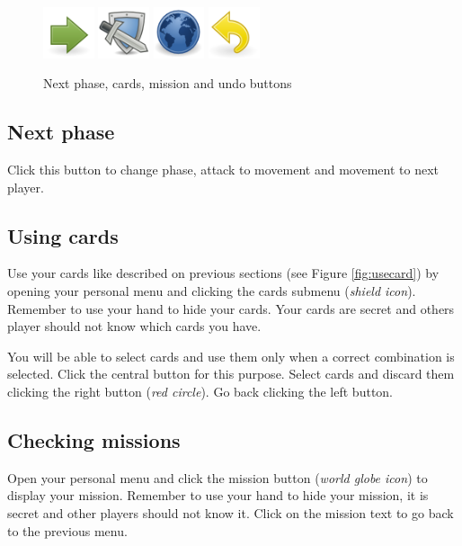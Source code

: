 \documentclass[12pt,a4paper]{article}
\begin{document}
\begin{figure}[h!]
\centering
\includegraphics[width=1.5cm]{pic/next.png}
\includegraphics[width=1.5cm]{pic/troops.png}
\includegraphics[width=1.5cm]{pic/world.png}
\includegraphics[width=1.5cm]{pic/undo.png}
\caption{Next phase, cards, mission and undo buttons}
\label{fig:playermenu}
\end{figure}

\subsection{Next phase}
Click this button to change phase, attack to movement and movement to next player.

\subsection{Using cards}
Use your cards like described on previous sections (see Figure \ref{fig:usecard}) by opening your personal menu and clicking the cards submenu ({\it shield icon}). Remember to use your hand to hide your cards. Your cards are secret and others player should not know which cards you have.

You will be able to select cards and use them only when a correct combination is selected. Click the central button for this purpose. Select cards and discard them clicking the right button ({\it red circle}). Go back clicking the left button. 

\subsection{Checking missions}
Open your personal menu and click the mission button ({\it world globe icon}) to display your mission. Remember to use your hand to hide your mission, it is secret and other players should not know it. Click on the mission text to go back to the previous menu.
\end{document}

